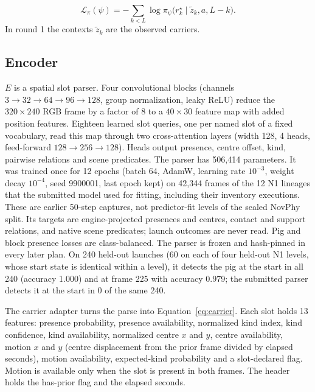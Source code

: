 \begin{equation}
\mathcal{L}_\pi(\psi)=-\sum_{k<L}\log\pi_\psi\big(r^{\star}_k\mid\tilde z_k,a,L-k\big).
\label{eq:distill}
\end{equation}
In round 1 the contexts $\tilde z_k$ are the observed carriers.

\begin{revblock}
\subsection{Encoder}

$E$ is a spatial slot parser. Four convolutional blocks (channels $3\to32\to64\to96\to128$, group normalization, leaky ReLU) reduce the $320\times240$ RGB frame by a factor of 8 to a $40\times30$ feature map with added position features. Eighteen learned slot queries, one per named slot of a fixed vocabulary, read this map through two cross-attention layers (width 128, 4 heads, feed-forward $128\to256\to128$). Heads output presence, centre offset, kind, pairwise relations and scene predicates. The parser has 506,414 parameters. It was trained once for 12 epochs (batch 64, AdamW, learning rate $10^{-3}$, weight decay $10^{-4}$, seed 9900001, last epoch kept) on 42,344 frames of the 12 N1 lineages that the submitted model used for fitting, including their inventory executions. These are earlier 50-step captures, not predictor-fit levels of the sealed NovPhy split. Its targets are engine-projected presences and centres, contact and support relations, and native scene predicates; launch outcomes are never read. Pig and block presence losses are class-balanced. The parser is frozen and hash-pinned in every later plan. On 240 held-out launches (60 on each of four held-out N1 levels, whose start state is identical within a level), it detects the pig at the start in all 240 (accuracy 1.000) and at frame 225 with accuracy 0.979; the submitted parser detects it at the start in 0 of the same 240.

The carrier adapter turns the parse into Equation~\ref{eq:carrier}. Each slot holds 13 features: presence probability, presence availability, normalized kind index, kind confidence, kind availability, normalized centre $x$ and $y$, centre availability, motion $x$ and $y$ (centre displacement from the prior frame divided by elapsed seconds), motion availability, expected-kind probability and a slot-declared flag. Motion is available only when the slot is present in both frames. The header holds the has-prior flag and the elapsed seconds.


\end{revblock}

